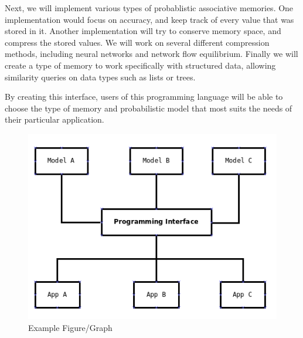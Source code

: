 \documentclass{sig-alternate}
\begin{document}
Next, we will implement various types of probablistic associative memories.
One implementation would focus on accuracy, and keep track of every value that
was stored in it. Another implementation will try to conserve memory space,
and compress the stored values. We will work on several different compression methods,
including neural networks and network flow equilibrium. Finally we will create
a type of memory to work specifically with structured data, allowing similarity
queries on data types such as lists or trees.

By creating this interface, users of this programming language will be able to
choose the type of memory and probabilistic model that most suits the needs of their particular
application. 

\begin{figure}[H]
	\begin{center}
		\includegraphics[width=0.90\linewidth]{block}
	\end{center}
	\vspace{-12pt}
	\caption{Example Figure/Graph}
	\label{fig:block}
\end{figure}

%
\end{document}
